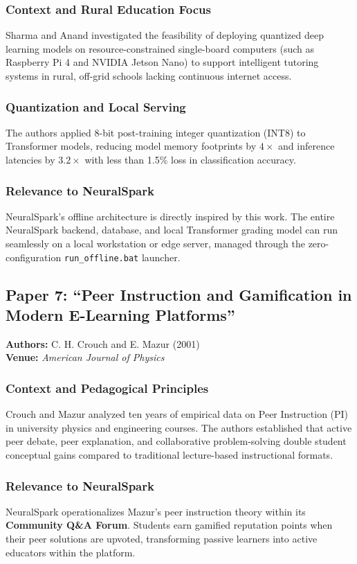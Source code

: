 \subsubsection{Context and Rural Education Focus}
Sharma and Anand investigated the feasibility of deploying quantized deep learning models on resource-constrained single-board computers (such as Raspberry Pi 4 and NVIDIA Jetson Nano) to support intelligent tutoring systems in rural, off-grid schools lacking continuous internet access.

\subsubsection{Quantization and Local Serving}
The authors applied 8-bit post-training integer quantization (INT8) to Transformer models, reducing model memory footprints by $4\times$ and inference latencies by $3.2\times$ with less than 1.5\% loss in classification accuracy.

\subsubsection{Relevance to NeuralSpark}
NeuralSpark's offline architecture is directly inspired by this work. The entire NeuralSpark backend, database, and local Transformer grading model can run seamlessly on a local workstation or edge server, managed through the zero-configuration \texttt{run\_offline.bat} launcher.

\subsection{Paper 7: ``Peer Instruction and Gamification in Modern E-Learning Platforms''}
\textbf{Authors:} C. H. Crouch and E. Mazur (2001) \cite{crouch2001} \\
\textbf{Venue:} \textit{American Journal of Physics}

\subsubsection{Context and Pedagogical Principles}
Crouch and Mazur analyzed ten years of empirical data on Peer Instruction (PI) in university physics and engineering courses. The authors established that active peer debate, peer explanation, and collaborative problem-solving double student conceptual gains compared to traditional lecture-based instructional formats.

\subsubsection{Relevance to NeuralSpark}
NeuralSpark operationalizes Mazur's peer instruction theory within its \textbf{Community Q\&A Forum}. Students earn gamified reputation points when their peer solutions are upvoted, transforming passive learners into active educators within the platform.

